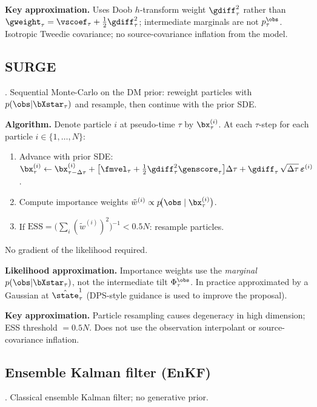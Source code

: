 \textbf{Key approximation.}
Uses Doob $h$-transform weight $\gdiff_\tau^2$ rather than $\gweight_\tau=\vscoef_\tau+\tfrac12\gdiff_\tau^2$; intermediate marginals are not $p_\tau^{\obs}$.
Isotropic Tweedie covariance; no source-covariance inflation from the model.

\subsection{SURGE}\label{appendix:method:surge}

\cite{wei_surge_2026}. Sequential Monte-Carlo on the DM prior: reweight particles with $p(\obs|\bXstar_\tau)$ and resample, then continue with the prior SDE.

\textbf{Algorithm.}
Denote particle $i$ at pseudo-time $\tau$ by $\bx_\tau^{(i)}$.
At each $\tau$-step for each particle $i\in\{1,\ldots,N\}$:
\begin{enumerate}
  \item Advance with prior SDE: $\bx_\tau^{(i)} \leftarrow \bx_{\tau-\Delta\tau}^{(i)}
        + \bigl[\fmvel_\tau+\tfrac12\gdiff_\tau^2\genscore_\tau\bigr]\Delta\tau
        + \gdiff_\tau\,\sqrt{\Delta\tau}\,\boldsymbol\varepsilon^{(i)}$.
  \item Compute importance weights $\tilde{w}^{(i)} \propto p\!\bigl(\obs\mid\bx_\tau^{(i)}\bigr)$.
  \item If $\mathrm{ESS} = \bigl(\sum_i (\tilde{w}^{(i)})^{2}\bigr)^{-1} < 0.5N$: resample particles.
\end{enumerate}
No gradient of the likelihood required.

\textbf{Likelihood approximation.}
Importance weights use the \emph{marginal} $p(\obs|\bXstar_\tau)$, not the intermediate tilt $\Phi_\tau^{\obs}$.
In practice approximated by a Gaussian at $\hat{\state}^1_\tau$ (DPS-style guidance is used to improve the proposal).

\textbf{Key approximation.}
Particle resampling causes degeneracy in high dimension; ESS threshold $=0.5N$.
Does not use the observation interpolant or source-covariance inflation.

\subsection{Ensemble Kalman filter (EnKF)}\label{appendix:method:enkf}

\cite{evensen_data_2022}. Classical ensemble Kalman filter; no generative prior.

